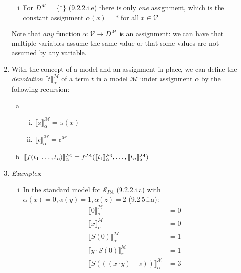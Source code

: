 \begin{enumerate}[\thesection.1]
\begin{enumerate}[(i)]
			\item For $D^\mathcal{M}=\{\ast\}$ (9.2.2.i.e) there is only \emph{one} assignment, which is the constant assignment $\alpha(x)=\ast$ for all $x\in\mathcal{V}$

		\end{enumerate}
		
		
		Note that \emph{any} function $\alpha:\mathcal{V}\to D^\mathcal{M}$ is an assignment: we can have that multiple variables assume the same value or that some values are not assumed by any variable.
		
		\item With the concept of a model and an assignment in place, we can define the \emph{denotation} $\llbracket t\rrbracket_\alpha^\mathcal{M}$ of a term $t$ in a model $\mathcal{M}$ under assignment $\alpha$ by the following recursion:
		
			\begin{enumerate}[(a)]
			
				\item		\begin{enumerate}[(i)]

					\item $\llbracket x\rrbracket_\alpha^\mathcal{M}=\alpha(x)$
					\item $\llbracket c\rrbracket_\alpha^\mathcal{M}=c^\mathcal{M}$
				
				\end{enumerate}
				
				\item $\llbracket f(t_1,\mathellipsis,t_n)\rrbracket_\alpha^\mathcal{M}=f^\mathcal{M}(\llbracket t_1\rrbracket_\alpha^\mathcal{M}, \mathellipsis, \llbracket t_n\rrbracket_\alpha^\mathcal{M})$
			
			\end{enumerate}
			
		\item \emph{Examples}: 
		
		\begin{enumerate}[(i)]
		
			\item In the standard model for $\mathcal{S}_{PA}$ (9.2.2.i.a) with $\alpha(x)=0,\alpha(y)=1,\alpha(z)=2$ (9.2.5.i.a):
			\begin{align*}
			\llbracket 0\rrbracket^\mathcal{M}_\alpha&=0\\
			\llbracket x\rrbracket^\mathcal{M}_\alpha&=0\\
			\llbracket S(0)\rrbracket^\mathcal{M}_\alpha&=1\\
			\llbracket y\cdot S(0)\rrbracket^\mathcal{M}_\alpha&=1\\
			\llbracket S(((x\cdot y)+z))\rrbracket^\mathcal{M}_\alpha&=3
			\end{align*}
			

\end{enumerate}
\end{enumerate}
